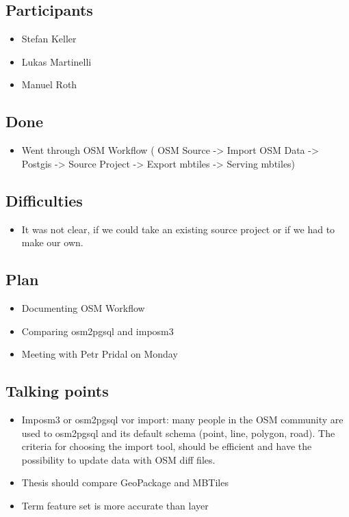 \subsection*{Participants}

\begin{itemize}
  \item Stefan Keller
  \item Lukas Martinelli
  \item Manuel Roth
\end{itemize}


\subsection*{Done}

\begin{itemize}
  \item Went through OSM Workflow ( OSM Source -> Import OSM Data -> Postgis -> Source Project -> Export mbtiles -> Serving mbtiles)
\end{itemize}

\subsection*{Difficulties}

\begin{itemize}
  \item It was not clear, if we could take an existing source project or if we had to make our own.
\end{itemize}

\subsection*{Plan}

\begin{itemize}
  \item Documenting OSM Workflow
  \item Comparing osm2pgsql and imposm3
  \item Meeting with Petr Pridal on Monday
\end{itemize}

\subsection*{Talking points}

\begin{itemize}
  \item Imposm3 or osm2pgsql vor import: many people in the OSM community are used to osm2pgsql and its default schema (point, line, polygon, road). The criteria for choosing the import tool, should be efficient and have the possibility to update data with OSM diff files.
  \item Thesis should compare GeoPackage and MBTiles 
  \item Term feature set is more accurate than layer
\end{itemize}

